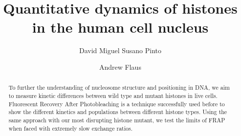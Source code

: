 \documentclass[a4paper,oneside,onecolumn,article,draft]{memoir}
\author{David Miguel Susano Pinto \and Andrew Flaus}
\title{Quantitative dynamics of histones in the human cell nucleus}
\begin{document}
  \maketitle

  \begin{abstract}
    To further the understanding of nucleosome structure and positioning
    in DNA, we aim to measure kinetic differences between wild type and
    mutant histones in live cells. Fluorescent Recovery After Photobleaching
    is a technique successfully used before to show the different kinetics and
    populations between different histone types. Using the same approach with
    our most disrupting histone mutant, we test the limits of FRAP when
    faced with extremely slow exchange ratios.
  \end{abstract}

  
  
  
  
  
\end{document}
